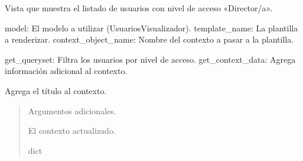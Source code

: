 \documentclass[letterpaper,10pt,spanish]{sphinxmanual}
\begin{document}
\begin{fulllineitems}

\pysigstartsignatures
{}
\pysigstopsignatures
\sphinxAtStartPar
Vista que muestra el listado de usuarios con nivel de acceso «Director/a».
\begin{description}
\sphinxAtStartPar
model: El modelo a utilizar (UsuariosVisualizador).
template\_name: La plantilla a renderizar.
context\_object\_name: Nombre del contexto a pasar a la plantilla.

\sphinxAtStartPar
get\_queryset: Filtra los usuarios por nivel de acceso.
get\_context\_data: Agrega información adicional al contexto.

\end{description}


\begin{fulllineitems}

\pysigstartsignatures
{}
\pysigstopsignatures
\end{fulllineitems}



\begin{fulllineitems}

\pysigstartsignatures
{}
\pysigstopsignatures
\sphinxAtStartPar
Agrega el título al contexto.
\begin{quote}\begin{description}
\sphinxAtStartPar
{} \textendash{} Argumentos adicionales.

\sphinxAtStartPar
El contexto actualizado.

\sphinxAtStartPar
dict

\end{description}\end{quote}

\end{fulllineitems}




\end{fulllineitems}
\end{document}
